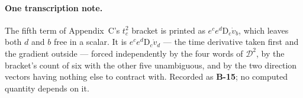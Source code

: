 

\paragraph{One transcription note.} The fifth term of Appendix~C's $t_c^2$
bracket is printed as $e^ce^d\mathrm D_c\dot v_b$, which leaves both $d$ and
$b$ free in a scalar. It is $e^ce^d\mathrm D_c\dot v_d$ --- the time derivative
taken first and the gradient outside --- forced independently by the four words
of $\mathcal D^2$, by the bracket's count of six with the other five
unambiguous, and by the two direction vectors having nothing else to contract
with. Recorded as \textbf{B-15}; no computed quantity depends on it.
